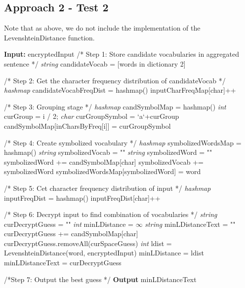 \documentclass[12pt]{article}
\begin{document}
\subsection{Approach 2 - Test 2}
Note that as above, we do not include the implementation of the LevenshteinDistance function.
\begin{algorithmic}[1]
\item[\textbf{Input:} encryptedInput]
    \State /* Step 1: Store candidate vocabularies in aggregated sentence */
    \State \emph{string} candidateVocab = [words in dictionary 2]
    \item[]

    \State /* Step 2: Get the character frequency distribution of candidateVocab */
    \State \emph{hashmap} candidateVocabFreqDist = hashmap() 
        \State inputCharFreqMap[char]++
    \EndFor
    \item[]

    \State /* Step 3: Grouping stage */
    \State \emph{hashmap} candSymbolMap = hashmap()
        \State\emph{int} curGroup = i / 2;
        \State\emph{char} curGroupSymbol = `a`+curGroup
        \State candSymbolMap[inCharsByFreq[i]] = curGroupSymbol
    \EndFor
    \item[]

    \State /* Step 4: Create symbolized vocabulary */
    \State \emph{hashmap} symbolizedWordsMap = hashmap()
    \State \emph{string} symbolizedVocab = ""
        \State \emph{string} symbolizedWord = ""
            \State symbolizedWord += candSymbolMap[char]
        \EndFor
        \State symbolizedVocab += symbolizedWord
        \State symbolizedWordsMap[symbolizedWord] = word
    \EndFor
    \item[]

    \State /* Step 5: Cet character frequency distribution of input */
    \State \emph{hashmap} inputFreqDist = hashmap()
        \State inputFreqDist[char]++
    \EndFor
    \item[]

    \State /* Step 6: Decrypt input to find combination of vocabularies */
    \State \emph{string} curDecryptGuess = ""
    \State \emph{int} minLDistance = $\infty$
    \State \emph{string} minLDistanceText = ""
            \State curDecryptGuess += candSymbolMap[char]
        \EndFor
        \State curDecryptGuess.removeAll(curSpaceGuess)
            \State \emph{int} ldist = LevenshteinDistance(word, encryptedInput)
                \State minLDistance = ldist
                \State minLDistanceText = curDecryptGuess
            \EndIf
        \EndFor 
    \EndFor
    \item[]

    \State /*Step 7: Output the best guess */
    \State \textbf{Output} minLDistanceText
\end{algorithmic}
\end{document}

